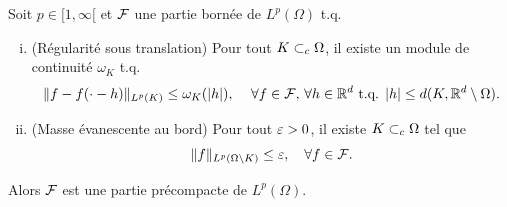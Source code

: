 \begin{theorem}
\label{th:FrechetKolmogorov}
%
	Soit $p \in [1,\infty[$ et $\mathcal{F}$ une partie bornée de $L^p(\Omega)$ t.q.\ %
	\begin{enumerate}[(i)]
		\item (Régularité sous translation) Pour tout $K \subset_c \Omega$, il existe un module de continuité $\omega_K$ t.q.\
		\begin{equation*}
			\|f - f(\cdot-h)\|_{L^p(K)} \leq \omega_K(|h|),\, \quad \forall f \in \mathcal{F},\, \forall h \in \mathbb{R}^d \text{ t.q. } |h| \leq d(K, \mathbb{R}^d \setminus \Omega).
		\end{equation*}
		\item (Masse évanescente au bord) Pour tout $\varepsilon>0$, il existe $K \subset_c \Omega$ tel que 
		\begin{equation*}
			\|f\|_{L^p(\Omega \setminus K)} \leq \varepsilon, \quad \forall f \in \mathcal{F}.
		\end{equation*}
	\end{enumerate}
	Alors $\mathcal{F}$ est une partie précompacte de $L^p(\Omega)$. 
\end{theorem}

